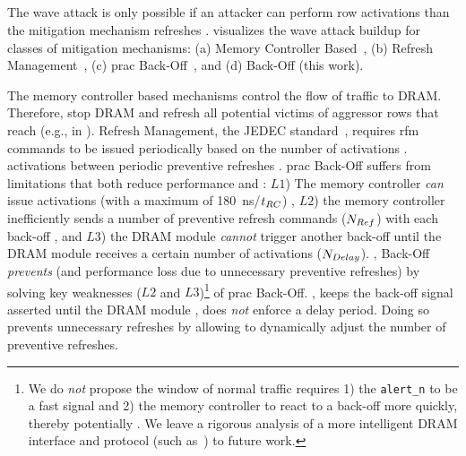 \subsection{}
The wave attack is only possible if an attacker can perform row activations  than the  mitigation mechanism refreshes .
 visualizes the wave attack buildup for  classes of mitigation mechanisms: (a) Memory Controller Based~\mcBasedRowHammerMitigations{}, (b) Refresh Management~\cite{jedec2024jesd795c}, (c) \gls{prac} Back-Off~\cite{jedec2024jesd795c}, and (d) \X{} Back-Off (this work).

The memory controller based mechanisms control the flow of traffic to DRAM.
Therefore,  stop  DRAM  and  refresh all potential victims of aggressor rows that reach  (e.g.,  in ).
Refresh Management,  the JEDEC standard~\cite{jedec2024jesd795c}, requires \gls{rfm} commands to be issued periodically based on the number of activations .
 activations between periodic preventive refreshes .
\gls{prac} Back-Off suffers from  limitations that both reduce performance and :
$L1$) The memory controller \emph{can} issue activations (with a maximum  of \SI{180}{\nano\second}/$t_{RC}{}$) ,
$L2$) the memory controller inefficiently sends a  number of preventive refresh commands ($N_{Ref}{}$) with each back-off , and
$L3$) the DRAM module \emph{cannot} trigger another back-off  until the DRAM module receives a certain number of activations ($N_{Delay}{}$).
, \X{} Back-Off  \emph{prevents}  (and performance loss due to unnecessary preventive refreshes) by solving  key weaknesses ($L2$ and $L3$)\footnote{We do \emph{not} propose  the window of normal traffic  requires 1) the \texttt{alert\_n} to be a fast signal and 2) the memory controller to react to a back-off more quickly, thereby potentially . We leave a rigorous analysis of  a more intelligent DRAM interface and protocol (such as~\cite{hassan2024self})  to future work.} of \gls{prac} Back-Off.
, \X{} keeps the back-off signal asserted until the DRAM module , \X{} does \emph{not} enforce a delay period.
Doing so prevents unnecessary refreshes by allowing \X{} to dynamically adjust the number of preventive refreshes.


